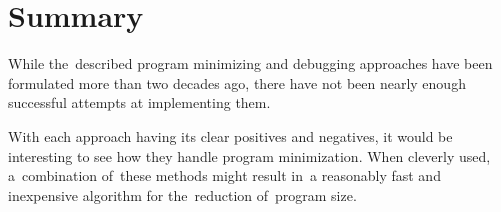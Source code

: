 \section{Summary}

While the~described program minimizing and debugging approaches have been 
formulated more than two decades ago, there have not been nearly enough 
successful attempts at implementing them. 

With each approach having its clear positives and negatives, 
it would be interesting to see how they handle program minimization. 
When cleverly used, a~combination of~these methods might 
result in~a reasonably fast and inexpensive algorithm 
for the~reduction of~program size.
